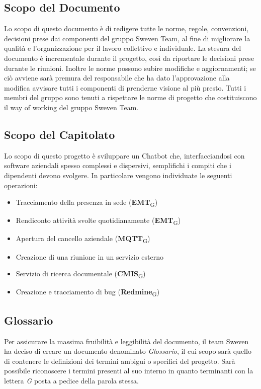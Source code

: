 \subsection{Scopo del Documento}
Lo scopo di questo documento è di redigere tutte le norme, regole, convenzioni, decisioni 
prese dai componenti del gruppo Sweven Team, al fine di migliorare la qualità e l'organizzazione
per il lavoro collettivo e individuale. \newline
La stesura del documento è incrementale durante il progetto, così da riportare le decisioni
prese durante le riunioni. Inoltre le norme possono subire modifiche e aggiornamenti;
se ciò avviene sarà premura del responsabile che ha dato l'approvazione alla modifica 
avvisare tutti i componenti di prenderne visione al più presto. \newline 
Tutti i membri del gruppo sono tenuti a rispettare le norme di progetto che costituiscono
il way of working del gruppo Sweven Team.

\subsection{Scopo del Capitolato}
Lo scopo di questo progetto è sviluppare un Chatbot che, interfacciandosi con software aziendali spesso 
complessi e dispersivi, semplifichi i compiti che i dipendenti devono svolgere. In particolare vengono 
individuate le seguenti operazioni: 
\begin{itemize}
	\item Tracciamento della presenza in sede (\textbf{EMT}\textsubscript{G})
	\item Rendiconto attività svolte quotidianamente (\textbf{EMT}\textsubscript{G})
	\item Apertura del cancello aziendale (\textbf{MQTT}\textsubscript{G})
	\item Creazione di una riunione in un servizio esterno
	\item Servizio di ricerca documentale (\textbf{CMIS}\textsubscript{G})
	\item Creazione e tracciamento di bug (\textbf{Redmine}\textsubscript{G})
\end{itemize}

\subsection{Glossario}
Per assicurare la massima fruibilità e leggibilità del documento, il team Sweven ha deciso di creare un 
documento denominato \textit{Glossario}, il cui scopo sarà quello di contenere le definizioni dei termini 
ambigui o specifici del progetto. Sarà possibile riconoscere i termini presenti al suo interno in quanto 
terminanti con la lettera \textit{G} posta a pedice della parola stessa. 

